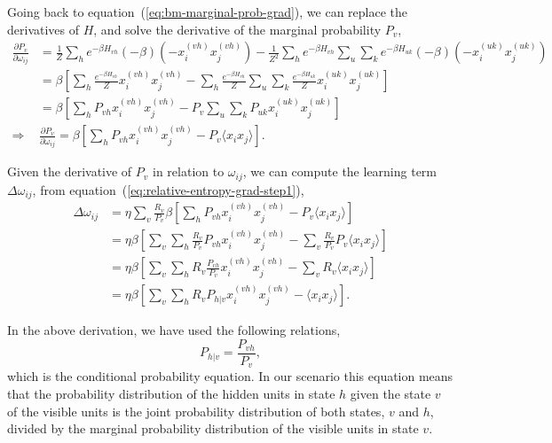 Going back to equation~(\ref{eq:bm-marginal-prob-grad}), we can replace the derivatives of $H$, and solve the derivative of the marginal probability $P_{v}$,
\begin{equation}
  \label{eq:bm-marginal-prob-grad-final}
  \begin{split}
    \frac{\partial P_{v}}{\partial \omega_{ij}} & = \frac{1}{Z} \sum_{h} e^{-\beta H_{vh}} (-\beta) (-x^{(vh)}_{i} x^{(vh)}_{j}) - \frac{1}{Z^{2}} \sum_{h} e^{-\beta H_{vh}} \sum_{u} \sum_{k} e^{-\beta H_{uk}} (-\beta) (-x^{(uk)}_{i} x^{(uk)}_{j}) \\
    & = \beta \left[ \sum_{h} \frac{e^{-\beta H_{vh}}}{Z} x^{(vh)}_{i} x^{(vh)}_{j} - \sum_{h} \frac{e^{-\beta H_{vh}}}{Z} \sum_{u} \sum_{k} \frac{e^{-\beta H_{uk}}}{Z} x^{(uk)}_{i} x^{(uk)}_{j}  \right] \\
    & = \beta \left[ \sum_{h} P_{vh} x^{(vh)}_{i} x^{(vh)}_{j} - P_{v} \sum_{u} \sum_{k} P_{uk} x^{(uk)}_{i} x^{(uk)}_{j} \right] \\
    \Rightarrow & \frac{\partial P_{v}}{\partial \omega_{ij}} = \beta \left[ \sum_{h} P_{vh} x^{(vh)}_{i} x^{(vh)}_{j} - P_{v} \langle x_{i} x_{j} \rangle  \right].
  \end{split}
\end{equation}

Given the derivative of $P_{v}$ in relation to $\omega_{ij}$, we can compute the learning term $\Delta \omega_{ij}$, from equation~(\ref{eq:relative-entropy-grad-step1}),
\begin{equation}
  \label{eq:delta-omega-final}
  \begin{split}
    \Delta \omega_{ij} & = \eta \sum_{v} \frac{R_{v}}{P_{v}} \beta \left[ \sum_{h} P_{vh} x^{(vh)}_{i} x^{(vh)}_{j} - P_{v} \langle x_{i} x_{j} \rangle \right]  \\
    & = \eta \beta \left[ \sum_{v} \sum_{h} \frac{R_{v}}{P_{v}} P_{vh} x^{(vh)}_{i} x^{(vh)}_{j} - \sum_{v} \frac{R_{v}}{P_{v}} P_{v} \langle x_{i} x_{j} \rangle \right] \\
    & = \eta \beta \left[ \sum_{v} \sum_{h} R_{v} \frac{P_{vh}}{P_{v}} x^{(vh)}_{i} x^{(vh)}_{j} - \sum_{v} R_{v} \langle x_{i} x_{j} \rangle \right] \\
    & = \eta \beta \left[ \sum_{v} \sum_{h} R_{v} P_{h|v} x^{(vh)}_{i} x^{(vh)}_{j} - \langle x_{i} x_{j} \rangle \right].
  \end{split}
\end{equation}

In the above derivation, we have used the following relations,
\begin{equation}
  \label{eq:conditional-prob1}
  P_{h|v} = \frac{P_{vh}}{P_{v}},
\end{equation}
which is the conditional probability equation.
In our scenario this equation means that the probability distribution of the hidden units in state $h$ given the state $v$ of the visible units is the joint probability distribution of both states, $v$ and $h$, divided by the marginal probability distribution of the visible units in state $v$.

